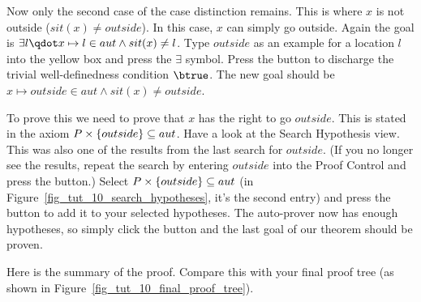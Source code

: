Now only the second case of the case distinction remains. This is where $x$ is not outside ($sit(x)\neq outside$). In this case, $x$ can simply go outside.
Again the goal is $\exists l\qdot x\mapsto l\in aut \land sit(x)\neq l$. Type
$outside$ as an example for a location $l$ into the yellow box and press
the $\exists$ symbol.
Press  the  button to discharge the trivial well-definedness condition $\btrue$.
The new goal should be $x \mapsto outside\in aut \land sit(x)\neq outside$.

To prove this we need to prove that $x$ has the right to go $outside$.
This is stated in the axiom $P \mathbin\times\{outside\}\subseteq aut$.
Have a look at the \textsf{Search Hypothesis} view. This was also one of the results from the last search for $outside$.
(If you no longer see the results, repeat the search by entering $outside$ into the \textsf{Proof Control} and press the  button.)
Select $P \mathbin\times\{outside\}\subseteq aut$ (in Figure~\ref{fig_tut_10_search_hypotheses}, it's the second entry) and
  press the  button to add it to your selected hypotheses. The auto-prover now has enough hypotheses, so simply click the  button and
  the last goal of our theorem should be proven.

Here is the summary of the proof. Compare this with your final proof tree (as shown in
Figure~\ref{fig_tut_10_final_proof_tree}).

